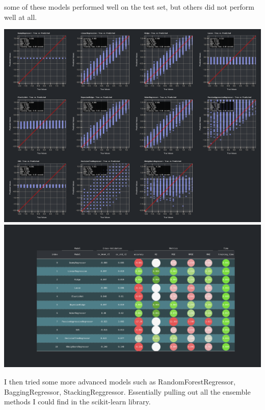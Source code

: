 \documentclass{assignment}
\begin{document}
some of these models performed well on the test set, but others did not perform well at all.
\begin{center}
    \includegraphics[width=6.5in]{../report/assets/base_models_results.pdf}    
    \includegraphics[width=6.5in]{../report/assets/base_models_results_table.pdf}    
\end{center}
I then tried some more advanced models such as RandomForestRegressor, BaggingRegressor, StackingReggressor.
Essentially pulling out all the ensemble methods I could find in the scikit-learn library.
\end{document}

